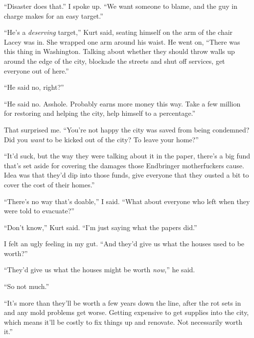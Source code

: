``Disaster does that.'' I spoke up.  ``We want someone to blame, and the guy in charge makes for an easy target.''



``He's a \emph{deserving} target,'' Kurt said, seating himself on the arm of the chair Lacey was in.  She wrapped one arm around his waist.  He went on, ``There was this thing in Washington.  Talking about whether they should throw walls up around the edge of the city, blockade the streets and shut off services, get everyone out of here.''



``He said no, right?''



``He said no.  Asshole.  Probably earns more money this way.  Take a few million for restoring and helping the city, help himself to a percentage.''



That surprised me.  ``You're not happy the city was saved from being condemned?  Did you \emph{want} to be kicked out of the city?  To leave your home?''



``It'd suck, but the way they were talking about it in the paper, there's a big fund that's set aside for covering the damages those Endbringer motherfuckers cause.  Idea was that they'd dip into those funds, give everyone that they ousted a bit to cover the cost of their homes.''



``There's no way that's doable,'' I said.  ``What about everyone who left when they were told to evacuate?''



``Don't know,'' Kurt said.  ``I'm just saying what the papers did.''



I felt an ugly feeling in my gut.  ``And they'd give us what the houses used to be worth?''



``They'd give us what the houses might be worth \emph{now},'' he said.



``So not much.''



``It's more than they'll be worth a few years down the line, after the rot sets in and any mold problems get worse.  Getting expensive to get supplies into the city, which means it'll be costly to fix things up and renovate.  Not necessarily worth it.''



